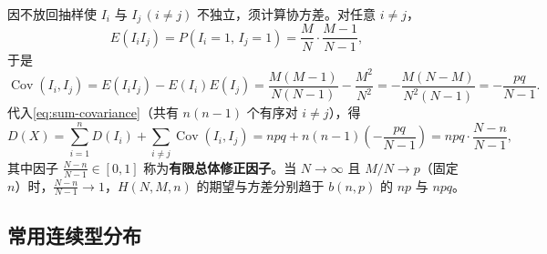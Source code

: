 \begin{enumerate}
  因不放回抽样使 $I_i$ 与 $I_j\,(i\ne j)$ 不独立，须计算协方差。对任意 $i\ne j$，
  \[
    E(I_i I_j)=P(I_i=1,\,I_j=1)=\frac{M}{N}\cdot\frac{M-1}{N-1},
  \]
  于是
  \[
    \operatorname{Cov}(I_i,I_j)=E(I_i I_j)-E(I_i)E(I_j)
    =\frac{M(M-1)}{N(N-1)}-\frac{M^2}{N^2}
    =-\frac{M(N-M)}{N^2(N-1)}=-\frac{pq}{N-1}.
  \]
  代入\eqref{eq:sum-covariance}（共有 $n(n-1)$ 个有序对 $i\ne j$），得
  \[
    D(X)=\sum_{i=1}^{n}D(I_i)+\sum_{i\ne j}\operatorname{Cov}(I_i,I_j)
    =npq+n(n-1)\left(-\frac{pq}{N-1}\right)
    =npq\cdot\frac{N-n}{N-1},
  \]
  其中因子 $\frac{N-n}{N-1}\in[0,1]$ 称为\textbf{有限总体修正因子}。当 $N\to\infty$ 且 $M/N\to p$（固定 $n$）时，$\frac{N-n}{N-1}\to 1$，$H(N,M,n)$ 的期望与方差分别趋于 $b(n,p)$ 的 $np$ 与 $npq$。
\end{enumerate}

\subsection{常用连续型分布}

